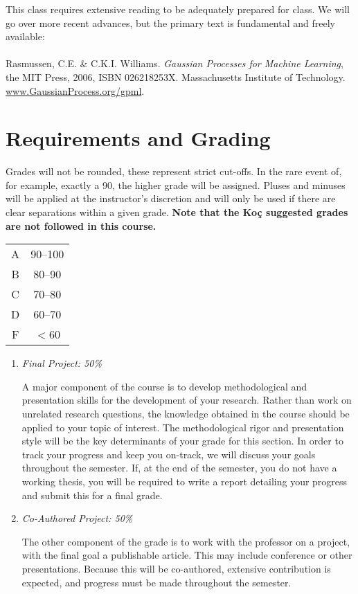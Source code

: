 \documentclass[12pt]{article}
\begin{document}
This class requires extensive reading to be adequately prepared for class. We will go over more recent advances, but the primary text is fundamental and freely available:\\\\

\noindent Rasmussen, C.E. \& C.K.I. Williams. \emph{Gaussian Processes for Machine Learning}, the MIT Press, 2006,
ISBN 026218253X. Massachusetts Institute of Technology. \href{www.GaussianProcess.org/gpml}{www.GaussianProcess.org/gpml}.\\

\section*{Requirements and Grading}

Grades will not be rounded, these represent strict cut-offs. In the rare event of, for example, exactly a 90, the higher grade will be assigned. Pluses and minuses will be applied at the instructor's discretion and will only be used if there are clear separations within a given grade. \textbf{Note that the Ko\c{c} suggested grades are not followed in this course.}

\begin{center}
\begin{tabular}{|c|c|}
\hline
A&90--100\\
B&80--90\\
C&70--80\\
D&60--70\\
F&$<$60\\
\hline
\end{tabular}
\end{center}

\begin{enumerate}[1)]


\item \emph{Final Project: 50\%}

A major component of the course is to develop methodological and presentation skills for the development of your research. Rather than work on unrelated research questions, the knowledge obtained in the course should be applied to your topic of interest. The methodological rigor and presentation style will be the key determinants of your grade for this section. In order to track your progress and keep you on-track, we will discuss your goals throughout the semester. If, at the end of the semester, you do not have a working thesis, you will be required to write a report detailing your progress and submit this for a final grade.

\item \emph{Co-Authored Project: 50\%}

The other component of the grade is to work with the professor on a project, with the final goal a publishable article. This may include conference or other presentations. Because this will be co-authored, extensive contribution is expected, and progress must be made throughout the semester.

\end{enumerate}
\end{document}
